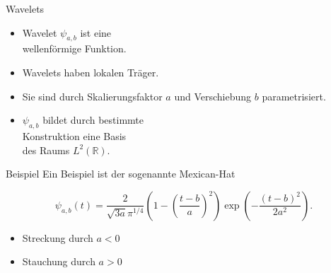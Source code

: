 \documentclass[aspectratio=169, 12pt]{beamer}
\begin{document}

\begin{frame}{Wavelets}
  \begin{figure}
    \vspace{-0.9cm}
    \resizebox{7.5cm}{!}{%
      
    }
  \end{figure}
  \leavevmode
  \begin{itemize}
    \item Wavelet $\psi_{a,b}$ ist eine \\ wellenförmige Funktion.
    \item Wavelets haben lokalen Träger.
    \item Sie sind durch Skalierungsfaktor $a$ und Verschiebung $b$ parametrisiert.
    \item $\psi_{a,b}$ bildet durch bestimmte \\ Konstruktion eine Basis \\ des Raums $L^2(\mathbb{R})$.
  \end{itemize}
\end{frame}

\begin{frame}{Beispiel}
  \vspace{-1.5cm}
  Ein Beispiel ist der sogenannte Mexican-Hat
  \begin{small}
    \begin{equation*}
      \psi_{a,b}(t) = \frac{2}{\sqrt{3a}\pi^{1/4}} \left( 1- \left( \frac{t-b}{a} \right)^2 \right) \exp \left( - \frac{\left( t-b \right)^2}{2a^2} \right).
    \end{equation*}
  \end{small}
  \begin{figure}
    \vspace{-0.6cm}
    \resizebox{5.4cm}{!}{%
      
    }
  \end{figure}
  \leavevmode
  \begin{itemize}
    \item Streckung durch $a<0$
    \item Stauchung durch $a>0$
  \end{itemize}
\end{frame}
\end{document}
